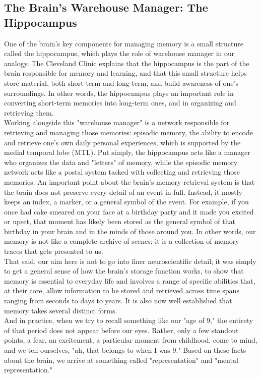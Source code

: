 \subsection{The Brain's Warehouse Manager: The Hippocampus}
\label{sub:hippocampus-warehouse-manager}
One of the brain's key components for managing memory is a small structure called the hippocampus, which plays the role of warehouse manager in our analogy. The Cleveland Clinic explains that the hippocampus is the part of the brain responsible for memory and learning, and that this small structure helps store material, both short-term and long-term, and build awareness of one's surroundings\autocite{clevelandclinic-hippocampus}. In other words, the hippocampus plays an important role in converting short-term memories into long-term ones, and in organizing and retrieving them.\\
Working alongside this "warehouse manager" is a network responsible for retrieving and managing those memories: episodic memory, the ability to encode and retrieve one's own daily personal experiences, which is supported by the medial temporal lobe (MTL)\autocite{roy2018hippocampalindex}. Put simply, the hippocampus acts like a manager who organizes the data and "letters" of memory, while the episodic memory network acts like a postal system tasked with collecting and retrieving those memories.\newpage
An important point about the brain's memory-retrieval system is that the brain does not preserve every detail of an event in full. Instead, it mostly keeps an index, a marker, or a general symbol of the event. For example, if you once had cake smeared on your face at a birthday party and it made you excited or upset, that moment has likely been stored as the general symbol of that birthday in your brain and in the minds of those around you. In other words, our memory is not like a complete archive of scenes; it is a collection of memory traces that gets presented to us\autocite{mitnews2017circuit}.\\
That said, our aim here is not to go into finer neuroscientific detail; it was simply to get a general sense of how the brain's storage function works, to show that memory is essential to everyday life and involves a range of specific abilities that, at their core, allow information to be stored and retrieved across time spans ranging from seconds to days to years. It is also now well established that memory takes several distinct forms\autocite{frankland2019retrieval}.\\
And in practice, when we try to recall something like our "age of 9," the entirety of that period does not appear before our eyes. Rather, only a few standout points, a fear, an excitement, a particular moment from childhood, come to mind, and we tell ourselves, "ah, that belongs to when I was 9." Based on these facts about the brain, we arrive at something called "representation" and "mental representation."
